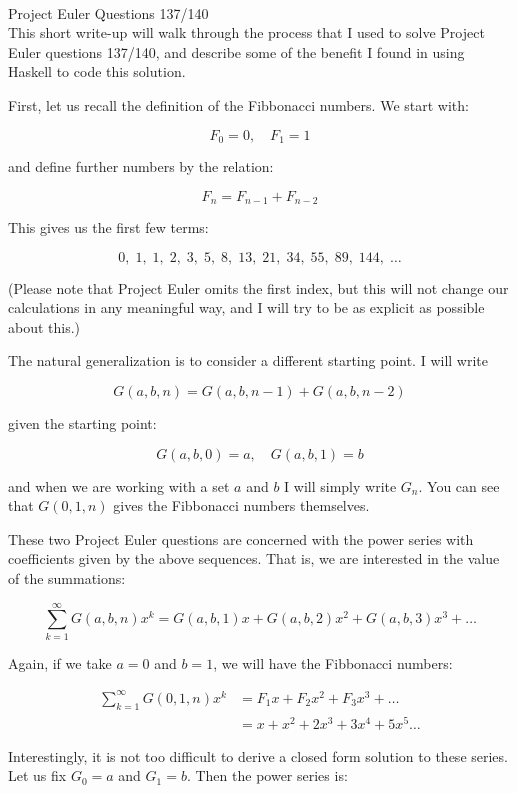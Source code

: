 \documentclass[12pt]{article}
\begin{document}
\\
Project Euler Questions 137/140\\

This short write-up will walk through the process that I used to solve Project Euler questions 137/140, and describe some of the benefit I found in using Haskell to code this solution.

First, let us recall the definition of the Fibbonacci numbers. We start with:

$$
F_0=0,\quad F_1= 1
$$

and define further numbers by the relation:

$$
F_n=F_{n-1} + F_{n-2}
$$

This gives us the first few terms:

$$
0,\;1,\;1,\;2,\;3,\;5,\;8,\;13,\;21,\;34,\;55,\;89,\;144,\; \ldots
$$

(Please note that Project Euler omits the first index, but this will not change our calculations in any meaningful way, and I will try to be as explicit as possible about this.)

The natural generalization is to consider a different starting point. I will write 

$$
G(a, b, n) = G(a, b, n-1) + G(a, b, n-2)
$$

given the starting point:

$$
G(a, b, 0) = a,\quad G(a, b, 1) = b
$$

and when we are working with a set $a$ and $b$ I will simply write $G_n$. You can see that $G(0, 1 , n)$ gives the Fibbonacci numbers themselves.

\newpage

These two Project Euler questions are concerned with the power series with coefficients given by the above sequences. That is, we are interested in the value of the summations:

$$
\sum_{k=1}^\infty G(a, b, n) x^k = G(a, b, 1)x + G(a, b, 2)x^2 + G(a, b, 3)x^3 + \dots
$$

Again, if we take $a=0$ and $b=1$, we will have the Fibbonacci numbers:

\begin{align*}
\sum_{k=1}^\infty G(0, 1, n) x^k &= F_1x + F_2x^2 + F_3x^3 + \dots \\
					  & = x + x^2 + 2x^3 + 3x^4 +5x^5 \dots
\end{align*}

Interestingly, it is not too difficult to derive a closed form solution to these series. Let us fix $G_0 = a$ and $G_1 = b$. Then the power series is:
\end{document}
